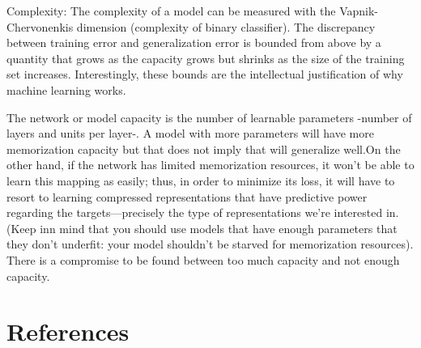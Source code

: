 \documentclass[11pt]{article}
\begin{document}
Complexity: The complexity of a model can be measured with the Vapnik-Chervonenkis dimension (complexity of binary classifier). The discrepancy between training error and generalization error is bounded from above by a quantity that grows as the capacity grows but shrinks as the size of the training set increases. Interestingly, these bounds are the intellectual justification of why machine learning works.

The network or model capacity is the number of learnable parameters -number of layers and units per layer-. A model with more parameters will have more memorization capacity but that does not imply that will generalize well.On the other hand, if the network has limited memorization resources, it won’t be able to learn this mapping as easily; thus, in order to minimize its loss, it will have to resort to learning compressed representations that have predictive power regarding the targets—precisely the type of representations we’re interested in. (Keep inn mind that you should use models that have enough parameters that they don’t underfit: your model shouldn’t be starved for memorization resources). There is a compromise to be found between too much capacity and not enough capacity.

\newpage
\section*{References}




\end{document}
